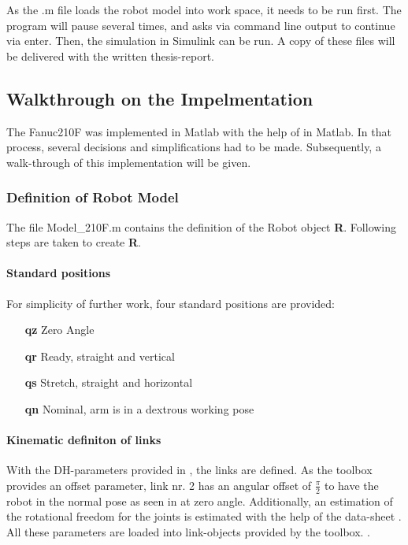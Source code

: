 As the .m file loads the robot model into work space, it needs to be run first. The program will pause several times, and asks via command line output to continue via enter.  Then, the simulation in Simulink can be run.
A copy of these files will be delivered with the written thesis-report.

\subsection{Walkthrough on the Impelmentation}
The Fanuc210F was implemented in Matlab with the help of \cite{CorkeRoboticVisionControl} in Matlab. In that process, several decisions and simplifications had to be made. Subsequently, a walk-through of this implementation will be given.

\subsubsection{Definition of Robot Model}
The file Model_210F.m contains the definition of the Robot object \textbf{R}. Following steps are taken to create \textbf{R}.

\paragraph{Standard positions}
For simplicity of further work, four standard positions are provided:\\
\begin{itemize}
	\item[\textbf{qz}] Zero Angle
	\item[\textbf{qr}] Ready, straight and vertical
	\item[\textbf{qs}] Stretch, straight and horizontal
	\item[\textbf{qn}] Nominal, arm is in a dextrous working pose
\end{itemize}

\paragraph{Kinematic definiton of links}
With the DH-parameters provided in , the links are defined. 
As the toolbox provides an offset parameter, link nr. 2 has an angular offset of $\frac{\pi}{2}$ to have the robot in the normal pose as seen in  at zero angle.
Additionally, an estimation of the rotational freedom for the joints is estimated with the help of the data-sheet \cite{210FDatasheet}. All these parameters are loaded into link-objects provided by the toolbox.
.
